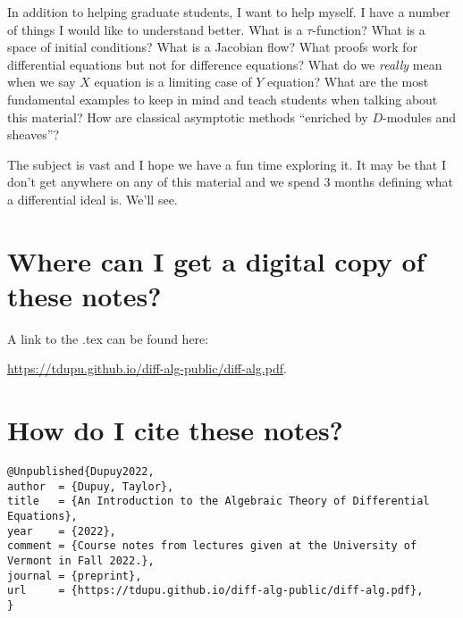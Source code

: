 \documentclass[12pt]{book}
\numberwithin{equation}{section}
\theoremstyle{definition}
\theoremstyle{remark}
\begin{document}
In addition to helping graduate students, I want to help  myself.
I have a number of things I would like to understand better. What is a $\tau$-function? What is a space of initial conditions? 
What is a Jacobian flow? What proofs work for differential equations but not for difference equations? 
What do we \emph{really} mean when we say $X$ equation is a limiting case of $Y$ equation?
What are the most fundamental examples to keep in mind and teach students when talking about this material?
How are classical asymptotic methods ``enriched by $D$-modules and sheaves''?

The subject is vast and I hope we have a fun time exploring it. 
It may be that I don't get anywhere on any of this material and we spend 3 months defining what a differential ideal is. 
We'll see. 

\iffalse
\section{A Note After Fall 2022} 
There is a manuscript by Manin \cite{Manin1978} which also attempts to unify differential algebraic and foliation theoretic perspectives on differential equations.

\fi


\section{Where can I get a digital copy of these notes?}
A link to the .tex can be found here:
\begin{center}
	\url{https://tdupu.github.io/diff-alg-public/diff-alg.pdf}.
\end{center}

\section{How do I cite these notes?}

\begin{verbatim}
@Unpublished{Dupuy2022,
author  = {Dupuy, Taylor},
title   = {An Introduction to the Algebraic Theory of Differential Equations},
year    = {2022},
comment = {Course notes from lectures given at the University of Vermont in Fall 2022.},
journal = {preprint},
url     = {https://tdupu.github.io/diff-alg-public/diff-alg.pdf},
}

\end{verbatim}
\end{document}
